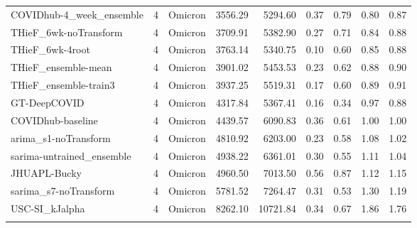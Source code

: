 \documentclass[12pt]{article}
\begin{document}
\begin{longtable}{lrlrrrrrr}
  COVIDhub-4\_week\_ensemble & 4 & Omicron & 3556.29 & 5294.60 & 0.37 & 0.79 & 0.80 & 0.87 \\ 
  THieF\_6wk-noTransform & 4 & Omicron & 3709.91 & 5382.90 & 0.27 & 0.71 & 0.84 & 0.88 \\ 
  THieF\_6wk-4root & 4 & Omicron & 3763.14 & 5340.75 & 0.10 & 0.60 & 0.85 & 0.88 \\ 
  THieF\_ensemble-mean & 4 & Omicron & 3901.02 & 5453.53 & 0.23 & 0.62 & 0.88 & 0.90 \\ 
  THieF\_ensemble-train3 & 4 & Omicron & 3937.25 & 5519.31 & 0.17 & 0.60 & 0.89 & 0.91 \\ 
  GT-DeepCOVID & 4 & Omicron & 4317.84 & 5367.41 & 0.16 & 0.34 & 0.97 & 0.88 \\ 
  COVIDhub-baseline & 4 & Omicron & 4439.57 & 6090.83 & 0.36 & 0.61 & 1.00 & 1.00 \\ 
  arima\_s1-noTransform & 4 & Omicron & 4810.92 & 6203.00 & 0.23 & 0.58 & 1.08 & 1.02 \\ 
  sarima-untrained\_ensemble & 4 & Omicron & 4938.22 & 6361.01 & 0.30 & 0.55 & 1.11 & 1.04 \\ 
  JHUAPL-Bucky & 4 & Omicron & 4960.50 & 7013.50 & 0.56 & 0.87 & 1.12 & 1.15 \\ 
  sarima\_s7-noTransform & 4 & Omicron & 5781.52 & 7264.47 & 0.31 & 0.53 & 1.30 & 1.19 \\ 
  USC-SI\_kJalpha & 4 & Omicron & 8262.10 & 10721.84 & 0.34 & 0.67 & 1.86 & 1.76 \\ 
   \hline
\hline
\label{tab:table_wave_us}
\end{longtable}
\endgroup%


\newpage





\end{document}
